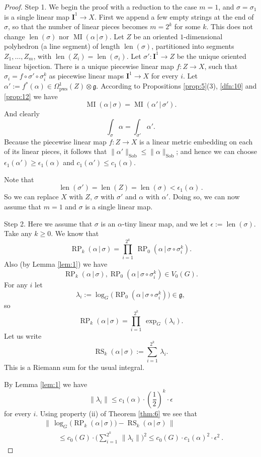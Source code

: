 \documentclass[10pt, a4paper]{amsart}
\theoremstyle{definition}
\numberwithin{equation}{section}
\newcommand{\opn}{\operatorname}
\newcommand{\mfrak}[1]{\mathfrak{#1}}
\newcommand{\mbf}[1]{\mathbf{#1}}
\newcommand{\mrm}[1]{\mathrm{#1}}
\newcommand{\smfrac}[2]{{\textstyle \frac{#1}{#2}}}
\newcommand{\norm}[1]{\lVert #1 \rVert}
\newcommand{\Norm}[1]{\bigl\lVert\, #1 \, \bigr\rVert}
\renewcommand{\vert}{\, | \,}
\newcommand{\g}{\mfrak{g}}
\begin{document}
\begin{proof}
Step 1. 
We begin the proof with a reduction to the case $m = 1$, and
$\sigma = \sigma_1$ is a single linear map $\mbf{I}^1 \to X$. 
First we append a few empty strings at the
end of $\sigma$, so that the number of linear pieces becomes 
$m = 2^k$ for some $k$. This does not change $\opn{len}(\sigma)$ nor
$\opn{MI}(\alpha \vert \sigma)$.
Let $Z$ be an oriented $1$-dimensional polyhedron (a line segment) of length 
$\opn{len}(\sigma)$, partitioned into segments
$Z_1, \ldots, Z_m$, with $\opn{len}(Z_i) = \opn{len}(\sigma_i)$.
Let $\sigma' : \mbf{I}^1 \to Z$ be the unique oriented linear bijection.
There is a unique piecewise linear map $f : Z \to X$, such that 
$\sigma_i = f \circ \sigma' \circ \sigma^k_i$ as piecewise linear maps
$\mbf{I}^1 \to X$ for every $i$.
Let $\alpha' := f^*(\alpha) \in \Omega^1_{\mrm{pws}}(Z) \otimes \g$.
According to Propositions \ref{prop:5}(3), \ref{dfn:10} and \ref{prop:12} we
have
\[ \opn{MI}(\alpha \vert \sigma) = \opn{MI}(\alpha' \vert \sigma') . \]
And clearly 
\[ \int_{\sigma} \alpha = \int_{\sigma'} \alpha' . \]
Because the piecewise linear map $f : Z \to X$ is a linear metric
embedding on each of its linear pieces, it follows that 
$\norm{\alpha'}_{\mrm{Sob}} \leq \norm{\alpha}_{\mrm{Sob}}$; and hence we can
choose
$\epsilon_1(\alpha') \geq \epsilon_1(\alpha)$ and 
$c_1(\alpha') \leq c_1(\alpha)$.

Note that 
\[ \opn{len}(\sigma') = \opn{len}(Z) = \opn{len}(\sigma) < \epsilon_1(\alpha)
\, . \]
So we can replace $X$ with $Z$, $\sigma$ with $\sigma'$ and $\alpha$ with
$\alpha'$. Doing so, we can now assume that $m = 1$ and $\sigma$ is a single
linear map.

\medskip \noindent
Step 2. Here we assume that $\sigma$ is an $\alpha$-tiny linear map, and we let
$\epsilon := \opn{len}(\sigma)$.
Take any $k \geq 0$. We know that
\[ \opn{RP}_{k}(\alpha \vert \sigma) = 
\prod_{i = 1}^{2^k} \,  \opn{RP}_{0}(\alpha \vert \sigma \circ \sigma^k_i) . \]
Also (by Lemma \ref{lem:1}) we have
\[ \opn{RP}_{k}(\alpha \vert \sigma), 
\opn{RP}_{0}(\alpha \vert \sigma \circ \sigma^k_i) \in V_0(G) . \]
For any $i$ let
\[ \lambda_i := \log_G \bigl( \opn{RP}_{0}(\alpha \vert \sigma \circ \sigma^k_i)
\bigr) \in \g , \]
so 
\[ \opn{RP}_{k}(\alpha \vert \sigma) = 
\prod_{i = 1}^{2^k} \, \exp_G(\lambda_i) . \]
Let us write
\[ \opn{RS}_k(\alpha \vert \sigma) := \sum_{i = 1}^{2^k} \,  \lambda_i . \]
This is a Riemann sum for the usual integral.

By Lemma \ref{lem:1} we have
\[ \norm{ \lambda_i } \leq 
c_1(\alpha) \cdot (\smfrac{1}{2})^k \cdot \epsilon  \]
for every $i$. Using property (ii) of Theorem \ref{thm:6} we see that
\[ \begin{aligned}
& \Norm{ 
\log_G \bigl( \opn{RP}_{k}(\alpha \vert \sigma) \bigr) -
\opn{RS}_{k}(\alpha \vert \sigma) } \\
& \qquad \leq 
c_0(G) \cdot \bigl( \sum\nolimits_{i = 1}^{2^k} \,  \norm{\lambda_i} \bigr)^2 
\leq c_0(G) \cdot c_1(\alpha)^2 \cdot \epsilon^2 \ . 
\end{aligned} \]


\end{proof}
\end{document}

